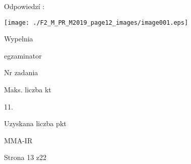 \documentclass[a4paper,12pt]{article}
\begin{document}
Odpowiedzí :
\begin{center}
\texttt{[image: ./F2\_M\_PR\_M2019\_page12\_images/image001.eps]}
\end{center}
Wypelnia

egzaminator

Nr zadania

Maks. liczba kt

11.

Uzyskana liczba pkt

MMA-IR

Strona 13 z22
\end{document}
